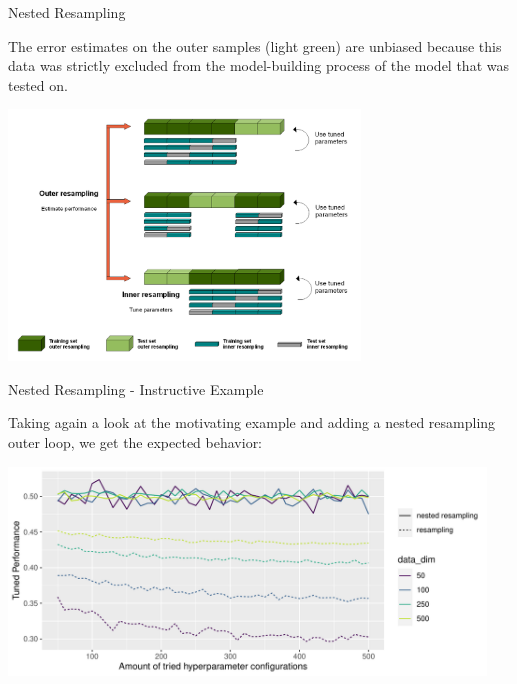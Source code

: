 \documentclass[11pt,compress,t,notes=noshow, xcolor=table]{beamer}
\begin{document}
\begin{vbframe}{Nested Resampling}
\framebreak

\begin{footnotesize}
The error estimates on the outer samples (light green) are unbiased because this data was strictly excluded from the model-building process of the model that was tested on.
\end{footnotesize}


\begin{center}\includegraphics[width = 0.7\textwidth]{figure_man/Nested_Resampling.png}\end{center}

\end{vbframe}



\begin{vbframe}{Nested Resampling - Instructive Example}

Taking again a look at the motivating example and adding a nested resampling outer loop, we get the expected behavior:

\begin{knitrout}\scriptsize
{}\color{fgcolor}

{\centering \includegraphics[width=0.95\textwidth]{figure/cart_tuning_nestresample_1} 
}


\end{knitrout}


\end{vbframe}
\endlecture
\end{document}
